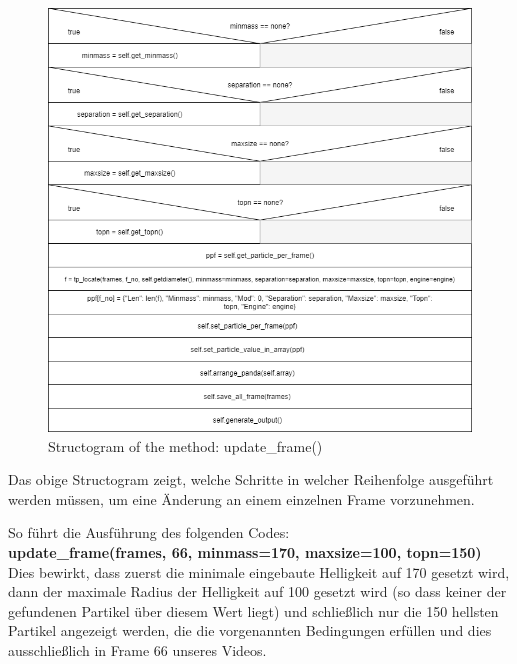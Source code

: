 \begin{figure}[H]
  \centering
  \includegraphics[width=1\textwidth]{Grafiken/pts/update_frame.png}
  \caption{Structogram of the method: update\_frame()}
\end{figure}

Das obige Structogram zeigt, welche Schritte in welcher Reihenfolge ausgeführt werden müssen, um eine Änderung an einem einzelnen Frame vorzunehmen.

So führt die Ausführung des folgenden Codes:\\
\textbf{update\_frame(frames, 66, minmass=170, maxsize=100, topn=150)}\\
Dies bewirkt, dass zuerst die minimale eingebaute Helligkeit auf 170 gesetzt wird, dann der maximale Radius der Helligkeit auf 100 gesetzt wird (so dass keiner der gefundenen Partikel über diesem Wert liegt) und schließlich nur die 150 hellsten Partikel angezeigt werden, die die vorgenannten Bedingungen erfüllen und dies ausschließlich in Frame 66 unseres Videos.






